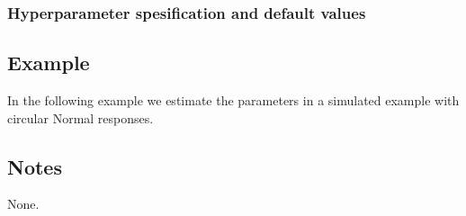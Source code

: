 \documentclass[a4paper,11pt]{article}
\begin{document}
\subsubsection*{Hyperparameter spesification and default values}


\subsection*{Example}

In the following example we estimate the parameters in a simulated
example with circular Normal responses.

\subsection*{Notes}

None.
\end{document}
